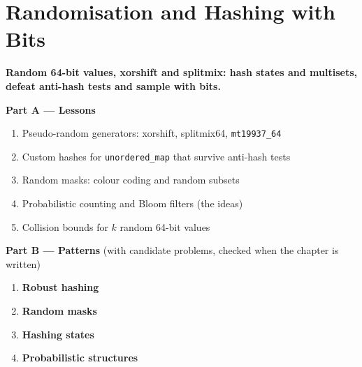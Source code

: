 \chapter{Randomisation and Hashing with Bits}
\label{ch:randomized}

\begin{tcolorbox}[enhanced, colback=white, colframe=secondaryblue, boxrule=1pt, arc=2mm]
\textbf{\large\textcolor{primaryblue}{Random 64-bit values, xorshift and splitmix: hash states and multisets, defeat anti-hash tests and sample with bits.}}
\end{tcolorbox}


\begin{plannedbox}
\textbf{Part A --- Lessons}
\begin{enumerate}[leftmargin=*, label=\textbf{A\arabic*.}, itemsep=1pt]
    \item Pseudo-random generators: xorshift, splitmix64, \texttt{mt19937\_64}
    \item Custom hashes for \texttt{unordered\_map} that survive anti-hash tests
    \item Random masks: colour coding and random subsets
    \item Probabilistic counting and Bloom filters (the ideas)
    \item Collision bounds for $k$ random 64-bit values
\end{enumerate}
\textbf{Part B --- Patterns} (with candidate problems, checked when the chapter is written)
\begin{enumerate}[leftmargin=*, label=\textbf{P\arabic*.}, itemsep=1pt]
    \item \textbf{Robust hashing}
    \item \textbf{Random masks}
    \item \textbf{Hashing states}
    \item \textbf{Probabilistic structures}
\end{enumerate}
\end{plannedbox}
